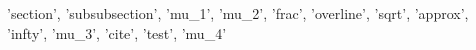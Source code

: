{'section', 'subsubsection', 'mu_1', 'mu_2', 'frac', 'overline', 'sqrt', 'approx', 'infty', 'mu_3', 'cite', 'test', 'mu_4'}
